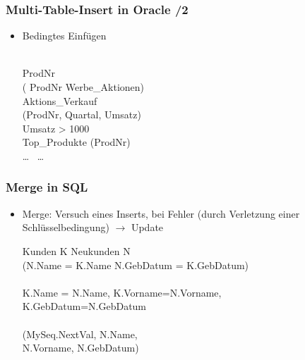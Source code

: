     \begin{frame}
    
    \frametitle{Multi-Table-Insert in Oracle /2}
    
    \begin{itemize}
    \item Bedingtes Einfügen
    
    \hspace*{-1cm}\begin{sql}
     \\
     ProdNr  \\
    \1 ( ProdNr  Werbe\_Aktionen) \\
     Aktions\_Verkauf \\
    \1  (ProdNr, Quartal, Umsatz) \\
     Umsatz > 1000 \\
    \1  Top\_Produkte  (ProdNr) \\
     \dots\  \dots
    \end{sql}
    
    \end{itemize}
    
    \end{frame}
    
    
    \begin{frame}
    
    \frametitle{Merge in SQL}
    
    \begin{itemize}
    \item Merge: Versuch eines Inserts, bei Fehler (durch Verletzung einer
      Schlüsselbedingung) $\rightarrow$ Update
    \hspace*{-1cm}\begin{sql}
     Kunden K  Neukunden N \\
     (N.Name = K.Name  N.GebDatum = K.GebDatum) \\
     \\
     K.Name = N.Name, K.Vorname=N.Vorname, \\
    \1 K.GebDatum=N.GebDatum \\
     \\
     (MySeq.NextVal, N.Name, \\
    \1 N.Vorname, N.GebDatum)
    \end{sql}
    
    \end{itemize}
    
    \end{frame}

